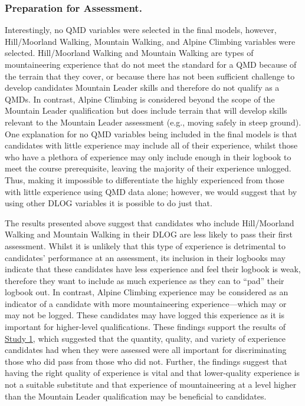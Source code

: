 \documentclass[
  12pt,
  a4paper,
]{book}
\begin{document}
\hypertarget{study-4-preparation-for-assessment}{%
\subsubsection{Preparation for Assessment.}\label{study-4-preparation-for-assessment}}

Interestingly, no QMD variables were selected in the final models, however, Hill/Moorland Walking, Mountain Walking, and Alpine Climbing variables were selected. Hill/Moorland Walking and Mountain Walking are types of mountaineering experience that do not meet the standard for a QMD because of the terrain that they cover, or because there has not been sufficient challenge to develop candidates Mountain Leader skills and therefore do not qualify as a QMDs. In contrast, Alpine Climbing is considered beyond the scope of the Mountain Leader qualification but does include terrain that will develop skills relevant to the Mountain Leader assessment (e.g., moving safely in steep ground). One explanation for no QMD variables being included in the final models is that candidates with little experience may include all of their experience, whilst those who have a plethora of experience may only include enough in their logbook to meet the course prerequisite, leaving the majority of their experience unlogged. Thus, making it impossible to differentiate the highly experienced from those with little experience using QMD data alone; however, we would suggest that by using other DLOG variables it is possible to do just that.

The results presented above suggest that candidates who include Hill/Moorland Walking and Mountain Walking in their DLOG are less likely to pass their first assessment. Whilst it is unlikely that this type of experience is detrimental to candidates' performance at an assessment, its inclusion in their logbooks may indicate that these candidates have less experience and feel their logbook is weak, therefore they want to include as much experience as they can to ``pad'' their logbook out. In contrast, Alpine Climbing experience may be considered as an indicator of a candidate with more mountaineering experience---which may or may not be logged. These candidates may have logged this experience as it is important for higher-level qualifications. These findings support the results of \protect\hyperlink{ml-qualitative}{Study 1}, which suggested that the quantity, quality, and variety of experience candidates had when they were assessed were all important for discriminating those who did pass from those who did not. Further, the findings suggest that having the right quality of experience is vital and that lower-quality experience is not a suitable substitute and that experience of mountaineering at a level higher than the Mountain Leader qualification may be beneficial to candidates.
\end{document}
